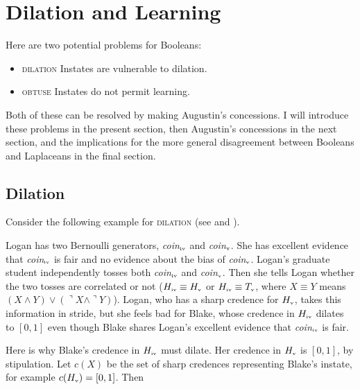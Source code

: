 \documentclass[11pt]{article}
\begin{document}
\section{Dilation and Learning}
\label{DilationLearningAndEntropy}

Here are two potential problems for Booleans:

\begin{itemize}
\item \textsc{dilation} Instates are vulnerable to dilation.
\item \textsc{obtuse} Instates do not permit learning.
\end{itemize}

Both of these can be resolved by making Augustin's concessions. I will
introduce these problems in the present section, then Augustin's
concessions in the next section, and the implications for the more
general disagreement between Booleans and Laplaceans in the final
section.

\subsection{Dilation}
\label{dilation}

Consider the following example for \textsc{dilation} (see
 and ).

\begin{quotex}
  \label{ex:dilation} Logan has two Bernoulli
  generators, \textit{coin}$_{\mbox{\tiny{iv}}}$ and
  \textit{coin}$_{\mbox{\tiny{v}}}$. She has excellent evidence that
  \textit{coin}$_{\mbox{\tiny{iv}}}$ is fair and no evidence about the
  bias of \textit{coin}$_{\mbox{\tiny{v}}}$. Logan's graduate student
  independently tosses both \textit{coin}$_{\mbox{\tiny{iv}}}$ and
  \textit{coin}$_{\mbox{\tiny{v}}}$. Then she tells Logan whether the
  two tosses are correlated or not
  ($H_{\mbox{\tiny{iv}}}\equiv{}H_{\mbox{\tiny{v}}}$ or
  $H_{\mbox{\tiny{iv}}}\equiv{}T_{\mbox{\tiny{v}}}$, where
  $X\equiv{}Y$ means
  $(X\wedge{}Y)\vee(\urcorner{}X\wedge\urcorner{}Y)$). Logan, who has
  a sharp credence for $H_{\mbox{\tiny{v}}}$, takes this information
  in stride, but she feels bad for Blake, whose credence in
  $H_{\mbox{\tiny{iv}}}$ dilates to $[0,1]$ even though Blake shares
  Logan's excellent evidence that \textit{coin}$_{\mbox{\tiny{iv}}}$
  is fair.
\end{quotex}

Here is why Blake's credence in $H_{\mbox{\tiny{iv}}}$ must dilate. Her
credence in $H_{\mbox{\tiny{v}}}$ is $[0,1]$, by stipulation. Let
$c(X)$ be the set of sharp credences representing Blake's instate, for
example $c(H_{\mbox{\tiny{v}}})=[0,1]$. Then
\end{document}

